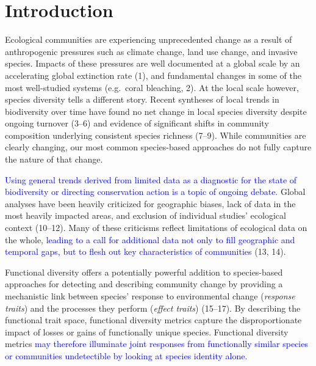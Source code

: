 \documentclass{article}
\begin{document}
\hypertarget{introduction}{%
\section{Introduction}\label{introduction}}

Ecological communities are experiencing unprecedented change as a result
of anthropogenic pressures such as climate change, land use change, and
invasive species. Impacts of these pressures are well documented at a
global scale by an accelerating global extinction rate (1), and
fundamental changes in some of the most well-studied systems (e.g.~coral
bleaching, 2). At the local scale however, species diversity tells a
different story. Recent syntheses of local trends in biodiversity over
time have found no net change in local species diversity despite ongoing
turnover (3--6) and evidence of significant shifts in community
composition underlying consistent species richness (7--9). While
communities are clearly changing, our most common species-based
approaches do not fully capture the nature of that change.

\textcolor{blue}{Using general trends derived from limited data as a diagnostic for the state of biodiversity or directing conservation action is a topic of ongoing debate.}
Global analyses have been heavily criticized for geographic biases, lack
of data in the most heavily impacted areas, and exclusion of individual
studies' ecological context (10--12). Many of these criticisms reflect
limitations of ecological data on the whole,
\textcolor{blue}{leading to a call for additional data not only to fill geographic and temporal gaps, but to flesh out key characteristics of communities}
(13, 14).

Functional diversity offers a potentially powerful addition to
species-based approaches for detecting and describing community change
by providing a mechanistic link between species' response to
environmental change (\emph{response traits}) and the processes they
perform (\emph{effect traits}) (15--17). By describing the functional
trait space, functional diversity metrics capture the disproportionate
impact of losses or gains of functionally unique species. Functional
diversity metrics
\textcolor{blue}{may therefore illuminate joint responses from functionally similar species or communities undetectible by looking at species identity alone.}
\end{document}
